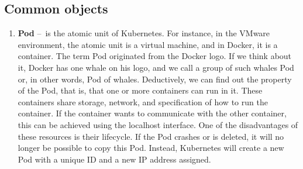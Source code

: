\subsection{Common objects}
\label{objects}

\begin{enumerate}[itemsep=1mm, parsep=0pt]
    \item \textbf{Pod} \---\ is the atomic unit of Kubernetes.
    For instance, in the VMware environment, the atomic unit is a virtual machine, and in Docker, it is a container.
    The term Pod originated from the Docker logo.
    If we think about it, Docker has one whale on his logo, and we call a group of such whales Pod or, in other words, Pod of whales.
    Deductively, we can find out the property of the Pod, that is, that one or more containers can run in it.
    These containers share storage, network, and specification of how to run the container.
    If the container wants to communicate with the other container, this can be achieved using the localhost interface.
    One of the disadvantages of these resources is their lifecycle.
    If the Pod crashes or is deleted, it will no longer be possible to copy this Pod.
    Instead, Kubernetes will create a new Pod with a unique ID and a new IP address assigned.


\end{enumerate}
